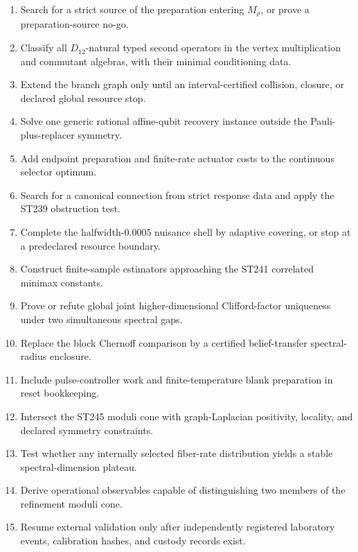 \documentclass[11pt,a4paper]{article}
\begin{document}
\begin{enumerate}
\item[\textbf{ST248}.] Search for a strict source of the preparation entering
$M_\rho$, or prove a preparation-source no-go.
\item[\textbf{ST249}.] Classify all $D_{12}$-natural typed second operators in the vertex
multiplication and commutant algebras, with their minimal conditioning data.
\item[\textbf{ST250}.] Extend the branch graph only until an interval-certified collision,
closure, or declared global resource stop.
\item[\textbf{ST251}.] Solve one generic rational affine-qubit recovery instance outside
the Pauli-plus-replacer symmetry.
\item[\textbf{ST252}.] Add endpoint preparation and finite-rate actuator costs to the
continuous selector optimum.
\item[\textbf{ST253}.] Search for a canonical connection from strict response data and
apply the ST239 obstruction test.
\item[\textbf{ST254}.] Complete the halfwidth-$0.0005$ nuisance shell by adaptive covering,
or stop at a predeclared resource boundary.
\item[\textbf{ST255}.] Construct finite-sample estimators approaching the ST241 correlated
minimax constants.
\item[\textbf{ST256}.] Prove or refute global joint higher-dimensional Clifford-factor
uniqueness under two simultaneous spectral gaps.
\item[\textbf{ST257}.] Replace the block Chernoff comparison by a certified
belief-transfer spectral-radius enclosure.
\item[\textbf{ST258}.] Include pulse-controller work and finite-temperature blank
preparation in reset bookkeeping.
\item[\textbf{ST259}.] Intersect the ST245 moduli cone with graph-Laplacian positivity,
locality, and declared symmetry constraints.
\item[\textbf{ST260}.] Test whether any internally selected fiber-rate distribution yields
a stable spectral-dimension plateau.
\item[\textbf{ST261}.] Derive operational observables capable of distinguishing two
members of the refinement moduli cone.
\item[\textbf{ST262}.] Resume external validation only after independently registered
laboratory events, calibration hashes, and custody records exist.
\end{enumerate}
\end{document}
